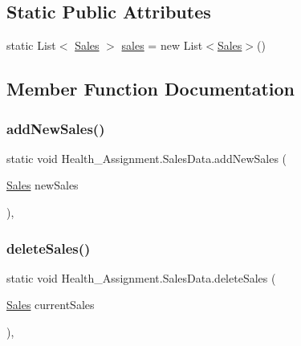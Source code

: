 \subsection*{Static Public Attributes}
\begin{DoxyCompactItemize}
\item 
static List$<$ \hyperlink{class_health___assignment_1_1_sales}{Sales} $>$ \hyperlink{class_health___assignment_1_1_sales_data_a0a76f0dd60503ccf76db4dc605f76460}{sales} = new List$<$\hyperlink{class_health___assignment_1_1_sales}{Sales}$>$()
\end{DoxyCompactItemize}


\subsection{Member Function Documentation}
\mbox{\label{class_health___assignment_1_1_sales_data_a9dfbf07570cde45fa90a473b57c9ea82}} 
\subsubsection{\texorpdfstring{add\+New\+Sales()}{addNewSales()}}
{\footnotesize\ttfamily static void Health\+\_\+\+Assignment.\+Sales\+Data.\+add\+New\+Sales (\begin{DoxyParamCaption}\item[{\hyperlink{class_health___assignment_1_1_sales}{Sales}}]{new\+Sales }\end{DoxyParamCaption})\hspace{0.3cm}{\ttfamily [inline]}, {\ttfamily [static]}}

\mbox{\label{class_health___assignment_1_1_sales_data_a3d84e394686110c7c9532b89949c26a3}} 
\subsubsection{\texorpdfstring{delete\+Sales()}{deleteSales()}}
{\footnotesize\ttfamily static void Health\+\_\+\+Assignment.\+Sales\+Data.\+delete\+Sales (\begin{DoxyParamCaption}\item[{\hyperlink{class_health___assignment_1_1_sales}{Sales}}]{current\+Sales }\end{DoxyParamCaption})\hspace{0.3cm}{\ttfamily [inline]}, {\ttfamily [static]}}

